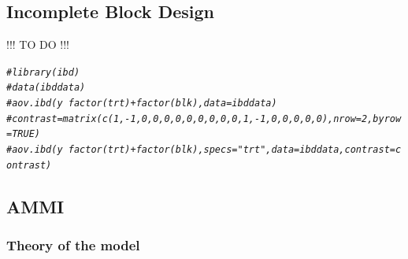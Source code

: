 \documentclass{book}\usepackage[]{graphicx}\usepackage[]{color}
\makeatletter
\newcommand{\hlcom}[1]{\textcolor[rgb]{0.678,0.584,0.686}{\textit{#1}}}%
\newenvironment{kframe}{%
 \def\at@end@of@kframe{}%
 \ifinner\ifhmode%
  \def\at@end@of@kframe{\end{minipage}}%
  \begin{minipage}{\columnwidth}%
 \fi\fi%
 \def\FrameCommand##1{\hskip\@totalleftmargin \hskip-\fboxsep
 \colorbox{shadecolor}{##1}\hskip-\fboxsep
     \hskip-\linewidth \hskip-\@totalleftmargin \hskip\columnwidth}%
 \MakeFramed {\advance\hsize-\width
   \@totalleftmargin\z@ \linewidth\hsize
   \@setminipage}}%
 {\par\unskip\endMakeFramed%
 \at@end@of@kframe}
\newenvironment{knitrout}{}{} %
\makeatother
\begin{document}
\subsection{Incomplete Block Design}
\label{ibd}

!!! TO DO !!!

\begin{knitrout}
\color{fgcolor}\begin{kframe}
\begin{alltt}
\hlcom{#library(ibd)}
\hlcom{#data(ibddata)}
\hlcom{#aov.ibd(y~factor(trt)+factor(blk),data=ibddata)}
\hlcom{#contrast=matrix(c(1,-1,0,0,0,0,0,0,0,0,0,1,-1,0,0,0,0,0),nrow=2,byrow=TRUE)}
\hlcom{#aov.ibd(y~factor(trt)+factor(blk),specs="trt",data=ibddata,contrast=contrast)}
\end{alltt}
\end{kframe}
\end{knitrout}
\newpage


\subsection{AMMI}
\label{ammi}

\subsubsection{Theory of the model}
\end{document}
